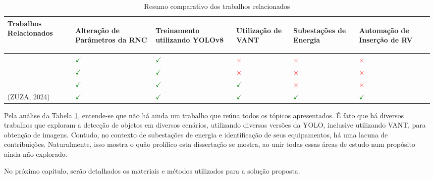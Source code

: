 \begin{table}[!hbt]
    \centering
    \caption{Resumo comparativo dos trabalhos relacionados}
    \begin{tabular}{ >{\centering\arraybackslash}m{5cm} | >{\centering\arraybackslash}m{2cm} | >{\centering\arraybackslash}m{2cm} | >{\centering\arraybackslash}m{2cm} | >{\centering\arraybackslash}m{2cm} | >{\centering\arraybackslash}m{2cm} }
    \hline
    \cellcolor[gray]{0.9} \textbf{Trabalhos Relacionados} & 
    \cellcolor[gray]{0.9} \begin{sideways} \textbf{Alteração de Parâmetros da RNC} \end{sideways} & 
    \cellcolor[gray]{0.9} \begin{sideways} \textbf{Treinamento utilizando YOLOv8} \end{sideways} & 
    \cellcolor[gray]{0.9} \begin{sideways} \textbf{Utilização de VANT} \end{sideways} & 
    \cellcolor[gray]{0.9} \begin{sideways} \textbf{Subestações de Energia} \end{sideways} &
    \cellcolor[gray]{0.9} \begin{sideways} \textbf{Automação de Inserção de RV} \end{sideways} \\
    \hline 
    \cite{gonzaga2023identificaccao} & \textcolor{green}{\(\checkmark\)} & \textcolor{green}{\(\checkmark\)} & \textcolor{red}{\(\times\)} & \textcolor{red}{\(\times\)} & \textcolor{red}{\(\times\)} \\
    \hline
    \cite{diascomparaccao} & \textcolor{green}{\(\checkmark\)} & \textcolor{green}{\(\checkmark\)} & \textcolor{red}{\(\times\)} & \textcolor{red}{\(\times\)} & \textcolor{red}{\(\times\)} \\
    \hline
    \cite{wang2023uav} & \textcolor{green}{\(\checkmark\)} & \textcolor{green}{\(\checkmark\)} & \textcolor{green}{\(\checkmark\)} & \textcolor{red}{\(\times\)} & \textcolor{red}{\(\times\)} \\
    \hline
    (ZUZA, 2024) & \textcolor{green}{\(\checkmark\)} & \textcolor{green}{\(\checkmark\)} & \textcolor{green}{\(\checkmark\)} & \textcolor{green}{\(\checkmark\)} & \textcolor{green}{\(\checkmark\)} \\
    \end{tabular}
    \label{tab:relacionado1}
\end{table}

Pela análise da Tabela \ref{tab:relacionado1}, entende-se que não há ainda um trabalho que reúna todos os tópicos apresentados. É fato que há diversos trabalhos que exploram a detecção de objetos em diversos cenários, utilizando diversas versões da YOLO, inclusive utilizando VANT, para obtenção de imagens. Contudo, no contexto de subestações de energia e identificação de seus equipamentos, há uma lacuna de contribuições. Naturalmente, isso mostra o quão prolífico esta dissertação se mostra, ao unir todas essas áreas de estudo num propósito ainda não explorado.

No próximo capítulo, serão detalhados os materiais e métodos utilizados para a solução proposta.















